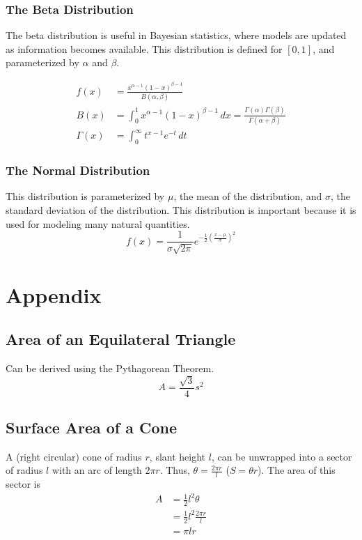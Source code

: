 \documentclass{article}
\begin{document}
\subsubsection{The Beta Distribution}
The beta distribution is useful in Bayesian statistics, where models are updated as information becomes available. This distribution is defined for $[0,1]$, and parameterized by $\alpha$ and $\beta$.

\begin{align*}
    f(x) &= \frac{x^{\alpha - 1}\left(1-x\right)^{\beta - 1}}{B(\alpha, \beta)}\\
    B(x) &= \int_0^1x^{\alpha-1}\left(1-x\right)^{\beta - 1}\,dx=\frac{\Gamma(\alpha)\Gamma(\beta)}{\Gamma(\alpha+\beta)}\\
    \Gamma(x) &= \int_0^\infty t^{x-1}e^{-t}\,dt
\end{align*}


\subsubsection{The Normal Distribution}
This distribution is parameterized by $\mu$, the mean of the distribution, and $\sigma$, the standard deviation of the distribution. This distribution is important because it is used for modeling many natural quantities.
$$f(x) = \frac{1}{\sigma\sqrt{2\pi}}e^{-\frac{1}{2}\left(\frac{x-\mu}{\sigma}\right)^2}$$

\section{Appendix}
\subsection{Area of an Equilateral Triangle}
Can be derived using the Pythagorean Theorem.
$$A = \frac{\sqrt{3}}{4}s^2$$

\subsection{Surface Area of a Cone}
A (right circular) cone of radius $r$, slant height $l$, can be unwrapped into a sector of radius $l$ with an arc of length $2 \pi r$. Thus, $\theta = \frac{2\pi r}{l}$ ($S = \theta r$).
The area of this sector is
\begin{align*}
    A & = \frac{1}{2} l^2 \theta  \\
      & = \frac{1}{2}l^2\frac{2\pi r}{l}  \\
      & = \pi lr
\end{align*}
\end{document}
